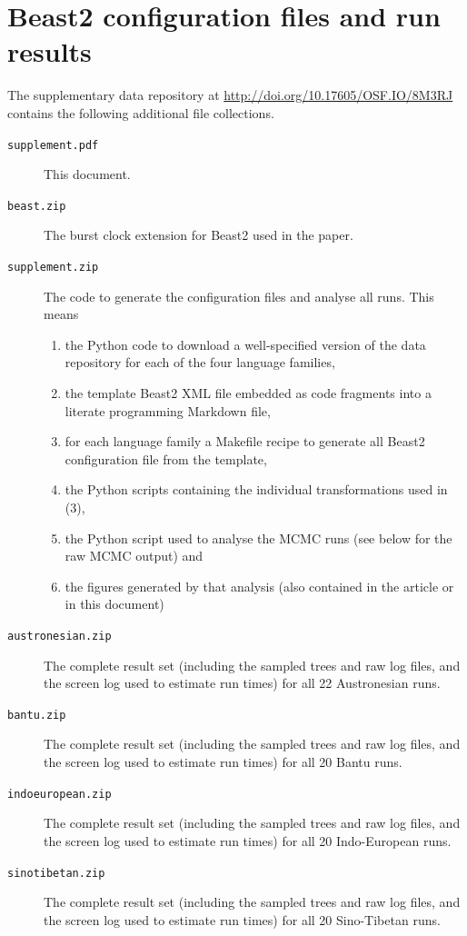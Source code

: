 \documentclass[a4paper]{article}
\begin{document}
\newpage
\section{Beast2 configuration files and run results}
The supplementary data repository at \url{http://doi.org/10.17605/OSF.IO/8M3RJ}
contains the following additional file collections.
\begin{description}
\item[\texttt{supplement.pdf}] This document.
\item[\texttt{beast.zip}] The burst clock extension for Beast2 used in the paper.
\item[\texttt{supplement.zip}] The code to generate the configuration files and analyse
  all runs. This means
  \begin{enumerate}
  \item the Python code to download a well-specified
    version of the data repository for each of the four language families,
  \item the template Beast2 XML file embedded as code fragments into a literate
    programming Markdown file,
  \item for each language family a Makefile recipe to
    generate all Beast2 configuration file from the template,
  \item the Python scripts containing the individual transformations used in
    (3),
  \item the Python script used to analyse the MCMC runs (see below for the raw MCMC output) and
  \item the figures generated by that analysis (also contained in the
    article or in this document)
  \end{enumerate}
\item[\texttt{austronesian.zip}] The complete result set (including the
  sampled trees and raw log files, and the screen log used to estimate run
  times) for all 22 Austronesian runs.
\item[\texttt{bantu.zip}] The complete result set (including the
  sampled trees and raw log files, and the screen log used to estimate run
  times) for all 20 Bantu runs.
\item[\texttt{indoeuropean.zip}] The complete result set (including the
  sampled trees and raw log files, and the screen log used to estimate run
  times) for all 20 Indo-European runs.
\item[\texttt{sinotibetan.zip}] The complete result set (including the
  sampled trees and raw log files, and the screen log used to estimate run
  times) for all 20 Sino-Tibetan runs.
\end{description}
\end{document}
